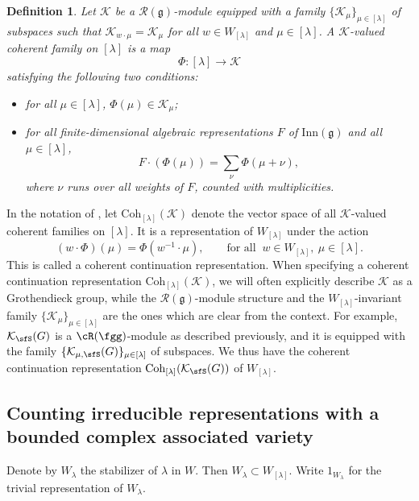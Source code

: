\documentclass[12pt,a4paper]{amsart}
\newcommand{\CK}{{\mathcal {K}}}
\newcommand{\g}{\mathfrak g}
\numberwithin{equation}{section}
\newtheorem{defn}[thm]{Definition}
\theoremstyle{remark}
\def\Coh{\mathrm{Coh}}
\newcommand{\Lam}{{[\lambda]}}
\newcommand{\Rg}{\cR(\fgg)}
\begin{document}
\begin{defn}\label{defcoh}
  Let $\CK$ be a $\mathcal R(\g)$-module equipped with a family
  $\{\CK_\mu\}_{\mu\in \Lam}$ of subspaces such that $\CK_{w \cdot \mu}=\CK_\mu$
  for all $w\in W_\Lam$ and $\mu\in \Lam$. A $\CK$-valued coherent family on
  $\Lam$ is a map
  \[
    \Phi: \Lam\rightarrow \CK%
  \]
  satisfying the following two conditions:
  \begin{itemize}
    \item for all $\mu\in \Lam$, $\Phi(\mu)\in \CK_\mu$;
    \item for all finite-dimensional algebraic representations $F$ of $\mathrm{Inn}(\g)$
          and all $\mu\in \Lam$,
          \[
          F \cdot (\Phi(\mu)) = \sum_{\nu} \Phi(\mu+\nu),
          \]
          where $\nu$ runs over all weights of $F$, counted with multiplicities.%
  \end{itemize}
\end{defn}


In the notation of , let $\Coh_{\Lam}(\CK)$ denote the
vector space of all $\mathcal K$-valued coherent families on $\Lam$. It is a
representation of $W_{\Lam}$ under the action
\[
  (w \cdot \Phi)(\mu) = \Phi(w^{-1}\cdot \mu), \qquad \textrm{for all
  }\ w\in W_\Lam, \ \mu\in \Lam.
\]
This is called a coherent continuation representation. When specifying a coherent continuation representation $\Coh_{\Lam}(\CK)$, we will often explicitly describe $\CK$ as a Grothendieck group, while the $\mathcal R(\g)$-module structure and the $W_\Lam$-invariant family  $\{\CK_\mu\}_{\mu\in \Lam}$ are the ones which are clear from the context.
For example, $\CK_\sfS(G)$ is a $\Rg$-module as described previously, and it is equipped with the family $\{\CK_{\mu, \sfS}(G)\}_{\mu\in \Lam}$ of subspaces. We thus have the coherent continuation representation $\Coh_{\Lam}(\CK_\sfS(G))$ of $W_\Lam$.




\subsection{Counting irreducible representations with a bounded complex
  associated variety} %

Denote by $W_\lambda$ the stabilizer of
$\lambda$ in $W$. Then $W_\lambda\subset W_\Lam$. Write $1_{W_\lambda}$ for the
trivial representation of $W_{\lambda}$.
\end{document}
